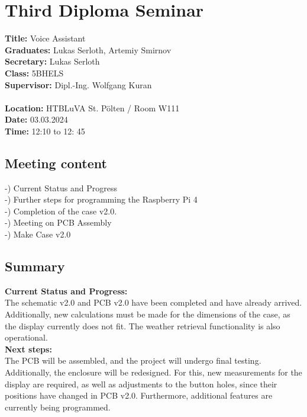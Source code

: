 
\section{Third Diploma Seminar}
\textbf{Title:} Voice Assistant\\

\noindent\textbf{Graduates:} Lukas Serloth, Artemiy Smirnov\\

\noindent\textbf{Secretary:} Lukas Serloth\\

\noindent\textbf{Class:} 5BHELS\\

\noindent\textbf{Supervisor:} Dipl.-Ing. Wolfgang Kuran\\ \\

\noindent\textbf{Location:} HTBLuVA St. Pölten / Room W111\\

\noindent\textbf{Date:} 03.03.2024\\

\noindent\textbf{Time:} 12:10 to 12: 45\\ 

\subsection{Meeting content}
-) Current Status and Progress \\ -) Further steps for programming the Raspberry Pi 4 \\ -) Completion of the case v2.0. \\ -) Meeting on PCB Assembly \\ -) Make Case v2.0

\subsection{Summary}
\textbf{Current Status and Progress:\\} 
The schematic v2.0 and PCB v2.0 have been completed and have already arrived. Additionally, new calculations must be made for the dimensions of the case, as the display currently does not fit. The weather retrieval functionality is also operational.\\

\noindent\textbf{Next steps:\\}
The PCB will be assembled, and the project will undergo final testing. Additionally, the enclosure will be redesigned. For this, new measurements for the display are required, as well as adjustments to the button holes, since their positions have changed in PCB v2.0.
Furthermore, additional features are currently being programmed.

